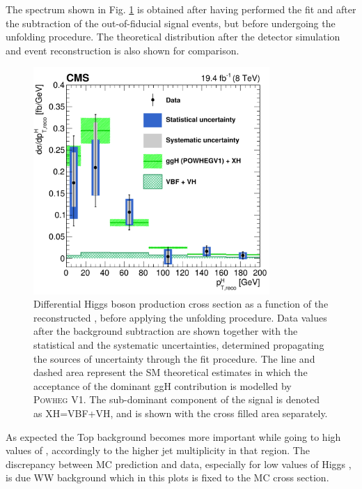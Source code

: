 The spectrum shown in Fig. \ref{fig:pre_unfolding} is obtained after having performed the fit and after the subtraction of the out-of-fiducial signal events, but before undergoing the unfolding procedure. The theoretical distribution after the detector simulation and event reconstruction is also shown for comparison.


\begin{figure}[!h]
\centering
\includegraphics[width=0.8\textwidth]{images/unblinding/pth_reco_paper.pdf}
\caption{Differential Higgs boson production cross section as a function of the reconstructed \pth{}, before applying the unfolding procedure. Data values after the background subtraction are shown together with the statistical and the systematic uncertainties, determined propagating the sources of uncertainty through the fit procedure. The line and dashed area represent the SM theoretical estimates in which the acceptance of the dominant ggH contribution is modelled by \textsc{Powheg V1}. The sub-dominant component of the signal is denoted as XH=VBF+VH, and is shown with the cross filled area separately.}\label{fig:pre_unfolding}
\end{figure}

As expected the Top background becomes more important while going to high values of \pth, accordingly to the higher jet multiplicity in that region. The discrepancy between MC prediction and data, especially for low values of Higgs \pt, is due WW background which in this plots is fixed to the MC cross section.

